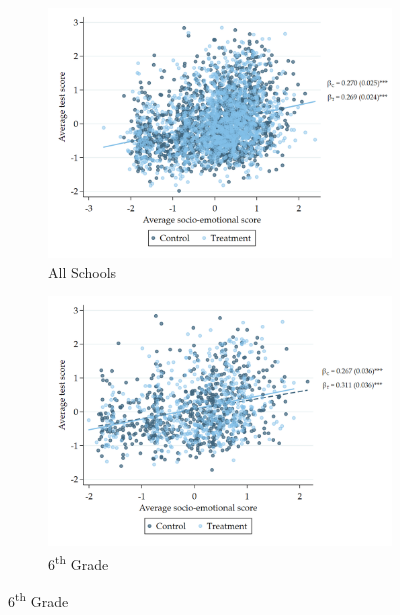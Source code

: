 \documentclass[11pt,a4paper]{article}
\begin{document}
\begin{figure}[htbp]

    \caption{Scatter Plot of Cognitive and Socio-Emotional Skills}
    \label{fig:scatter_test_socio}
    
    \begin{subfigure}{\textwidth}
        \caption{All Schools}
        \label{fig:scatter_test_socio_all}
        \raggedleft
        \includegraphics[width=15cm]{DataWork/Output/Figures/figA4a-scatter_test_socio.png}
    \end{subfigure}
    
    \begin{subfigure}{\textwidth}
        \caption{6\textsuperscript{th} Grade}
        \label{fig:scatter_test_socio_grade6}
        \raggedleft
        \includegraphics[width=15cm]{DataWork/Output/Figures/figA4b-scatter_test_socio_grade6.png}
    \end{subfigure}
    

\end{figure}
\end{document}
